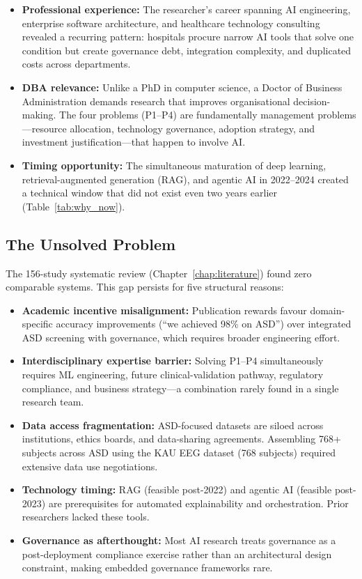 \begin{itemize}[leftmargin=*, itemsep=3pt]
    \item \textbf{Professional experience:} The researcher's career spanning AI engineering, enterprise software architecture, and healthcare technology consulting revealed a recurring pattern: hospitals procure narrow AI tools that solve one condition but create governance debt, integration complexity, and duplicated costs across departments.
    \item \textbf{DBA relevance:} Unlike a PhD in computer science, a Doctor of Business Administration demands research that improves organisational decision-making. The four problems (P1--P4) are fundamentally management problems---resource allocation, technology governance, adoption strategy, and investment justification---that happen to involve AI.
    \item \textbf{Timing opportunity:} The simultaneous maturation of deep learning, retrieval-augmented generation (RAG), and agentic AI in 2022--2024 created a technical window that did not exist even two years earlier (Table~\ref{tab:why_now}).
\end{itemize}

\subsection{The Unsolved Problem}
\label{sec:why_unsolved}

The 156-study systematic review (Chapter~\ref{chap:literature}) found zero comparable systems. This gap persists for five structural reasons:

\begin{itemize}[leftmargin=*, itemsep=3pt]
    \item \textbf{Academic incentive misalignment:} Publication rewards favour domain-specific accuracy improvements (``we achieved 98\% on ASD'') over integrated ASD screening with governance, which requires broader engineering effort.
    \item \textbf{Interdisciplinary expertise barrier:} Solving P1--P4 simultaneously requires ML engineering, future clinical-validation pathway, regulatory compliance, and business strategy---a combination rarely found in a single research team.
    \item \textbf{Data access fragmentation:} ASD-focused datasets are siloed across institutions, ethics boards, and data-sharing agreements. Assembling 768+ subjects across ASD using the KAU EEG dataset (768 subjects) required extensive data use negotiations.
    \item \textbf{Technology timing:} RAG (feasible post-2022) and agentic AI (feasible post-2023) are prerequisites for automated explainability and orchestration. Prior researchers lacked these tools.
    \item \textbf{Governance as afterthought:} Most AI research treats governance as a post-deployment compliance exercise rather than an architectural design constraint, making embedded governance frameworks rare.
\end{itemize}

